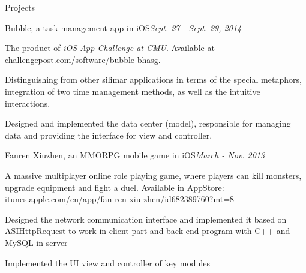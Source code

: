 \documentclass{resume} %
\begin{document}

\begin{rSection}{Projects}

\begin{rSubsection}{Bubble, a task management app in iOS}{\em Sept. 27 - Sept. 29, 2014}{}{}
\item The product of \textit{iOS App Challenge at CMU}. Available at challengepost.com/software/bubble-bhasg.
\item Distinguishing from other silimar applications in terms of the special metaphors, integration of two time management methods, as well as the intuitive interactions.
\item Designed and implemented the data center (model), responsible for managing data and providing the interface for view and controller.

\end{rSubsection}


\begin{rSubsection}{Fanren Xiuzhen, an MMORPG mobile game in iOS}{\em March - Nov. 2013}{}{}
\item A massive multiplayer online role playing game, where players can kill monsters, upgrade equipment and fight a duel. Available in AppStore: itunes.apple.com/cn/app/fan-ren-xiu-zhen/id682389760?mt=8
\item Designed the network communication interface and implemented it based on ASIHttpRequest to work in client part and back-end program with C++ and MySQL in server
\item Implemented the UI view and controller of key modules 
\end{rSubsection}


\end{rSection}








\end{document}
